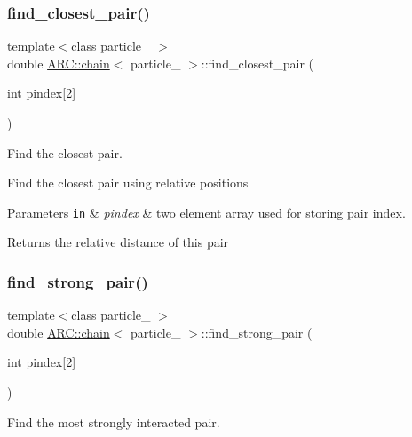 \subsubsection{\texorpdfstring{find\+\_\+closest\+\_\+pair()}{find\_closest\_pair()}}
{\footnotesize\ttfamily template$<$class particle\+\_\+ $>$ \\
double \hyperlink{classARC_1_1chain}{A\+R\+C\+::chain}$<$ particle\+\_\+ $>$\+::find\+\_\+closest\+\_\+pair (\begin{DoxyParamCaption}\item[{int}]{pindex\mbox{[}2\mbox{]} }\end{DoxyParamCaption})\hspace{0.3cm}{\ttfamily [inline]}}



Find the closest pair. 

Find the closest pair using relative positions 
\begin{DoxyParams}[1]{Parameters}
\mbox{\tt in}  & {\em pindex} & two element array used for storing pair index. \\
\hline
\end{DoxyParams}
\begin{DoxyReturn}{Returns}
the relative distance of this pair 
\end{DoxyReturn}
\hypertarget{classARC_1_1chain_a2ba334c62d603425faadda4019021dc4}{}\label{classARC_1_1chain_a2ba334c62d603425faadda4019021dc4} 
\subsubsection{\texorpdfstring{find\+\_\+strong\+\_\+pair()}{find\_strong\_pair()}}
{\footnotesize\ttfamily template$<$class particle\+\_\+ $>$ \\
double \hyperlink{classARC_1_1chain}{A\+R\+C\+::chain}$<$ particle\+\_\+ $>$\+::find\+\_\+strong\+\_\+pair (\begin{DoxyParamCaption}\item[{int}]{pindex\mbox{[}2\mbox{]} }\end{DoxyParamCaption})\hspace{0.3cm}{\ttfamily [inline]}}



Find the most strongly interacted pair. 


